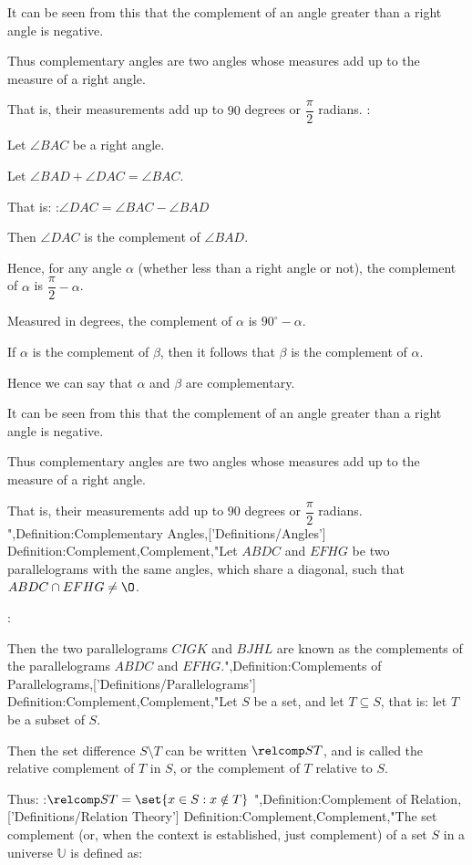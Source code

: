 It can be seen from this that the complement of an angle greater than a right angle is negative.


Thus complementary angles are two angles whose measures add up to the measure of a right angle.

That is, their measurements add up to $90$ degrees or $\dfrac \pi 2$ radians.
:

Let $\angle BAC$ be a right angle.

Let $\angle BAD + \angle DAC = \angle BAC$.

That is:
:$\angle DAC = \angle BAC - \angle BAD$


Then $\angle DAC$ is the complement of $\angle BAD$.


Hence, for any angle $\alpha$ (whether less than a right angle or not), the complement of $\alpha$ is $\dfrac \pi 2 - \alpha$.

Measured in degrees, the complement of $\alpha$ is $90^\circ - \alpha$.


If $\alpha$ is the complement of $\beta$, then it follows that $\beta$ is the complement of $\alpha$.

Hence we can say that $\alpha$ and $\beta$ are complementary.


It can be seen from this that the complement of an angle greater than a right angle is negative.


Thus complementary angles are two angles whose measures add up to the measure of a right angle.

That is, their measurements add up to $90$ degrees or $\dfrac \pi 2$ radians.
",Definition:Complementary Angles,['Definitions/Angles']
Definition:Complement,Complement,"Let $ABDC$ and $EFHG$ be two parallelograms with the same angles, which share a diagonal, such that $ABDC \cap EFHG \ne \O$.

:

Then the two parallelograms $CIGK$ and $BJHL$ are known as the complements of the parallelograms $ABDC$ and $EFHG$.",Definition:Complements of Parallelograms,['Definitions/Parallelograms']
Definition:Complement,Complement,"Let $S$ be a set, and let $T \subseteq S$, that is: let $T$ be a subset of $S$.

Then the set difference $S \setminus T$ can be written $\relcomp S T$, and is called the relative complement of $T$ in $S$, or the complement of $T$ relative to $S$.

Thus:
:$\relcomp S T = \set {x \in S : x \notin T}$
",Definition:Complement of Relation,['Definitions/Relation Theory']
Definition:Complement,Complement,"The set complement (or, when the context is established, just complement) of a set $S$ in a universe $\mathbb U$ is defined as:

